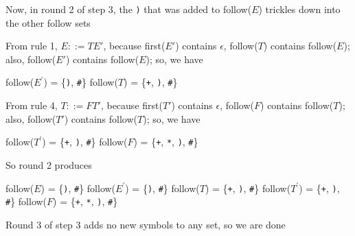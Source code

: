 \documentclass[8pt,a4paper,compress]{beamer}
\newcommand{\mm}[1]{$#1$}
\newcommand{\expo}[2]{$#1^{#2}$}
\newenvironment{spaced}
{
\smallskip
\hspace{.5cm}
\begin{minipage}[c]{\textwidth}
}
{
\end{minipage}
\smallskip
}
\begin{document}
\begin{frame}[fragile]
\pause

Now, in round 2 of step 3, the \lstinline{)} that was added to follow($E$) trickles down into the other follow sets

\pause
\bigskip

From rule 1, $E  ::= T E'$, because first($E'$) contains $\epsilon$, follow($T$) contains follow($E$); also, follow($E'$) contains follow($E$); so, we have

\text{ }
\begin{spaced}
\begin{production}
follow(\expo{E}{\prime}) = \{\lstinline{)}, \lstinline{#}\}
follow(\mm{T})  = \{\lstinline{+}, \lstinline{)},  \lstinline{#}\}
\end{production}
\end{spaced}

\pause

From rule 4, $T  ::= F T'$, because first($T'$) contains $\epsilon$, follow($F$) contains follow($T$); also, follow($T'$) contains follow($T$); so, we have

\text{ }
\begin{spaced}
\begin{production}
follow(\expo{T}{\prime}) = \{\lstinline{+}, \lstinline{)}, \lstinline{#}\}
follow(\mm{F})  = \{\lstinline{+}, \lstinline{*}, \lstinline{)}, \lstinline{#}\}
\end{production}
\end{spaced}

\pause

So round 2 produces

\text{ }
\begin{spaced}
\begin{production}
follow(\mm{E})  = \{\lstinline{)}, \lstinline{#}\}
follow(\expo{E}{\prime}) = \{\lstinline{)}, \lstinline{#}\}
follow(\mm{T})  = \{\lstinline{+}, \lstinline{)},  \lstinline{#}\}
follow(\expo{T}{\prime}) = \{\lstinline{+}, \lstinline{)}, \lstinline{#}\}
follow(\mm{F})  = \{\lstinline{+}, \lstinline{*}, \lstinline{)}, \lstinline{#}\}
\end{production}
\end{spaced}

\pause

Round 3 of step 3 adds no new symbols to any set, so we are done
\end{frame}
\end{document}

